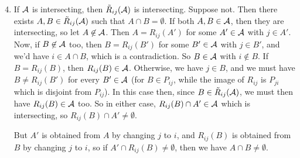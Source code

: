 \begin{enumerate}\setcounter{enumi}{3}
	\item  If $\mathcal{A}$ is intersecting, then $\tilde{R}_{ij}(\mathcal{A})$ is intersecting.
	Suppose not. Then there exists $A,B\in \tilde{R}_{ij}(\mathcal{A})$ such that $A\cap B= \emptyset$. If both $A,B\in \mathcal{A}$, then they are intersecting, so let $A\not \in \mathcal{A}$. Then $A = R_{ij}(A')$ for some $ A'\in \mathcal{A}$ with $j\in A'$. Now, if $B \not \in \mathcal{A}$ too, then $B = R_{ij}(B')$ for some $B'\in \mathcal{A}$ with $j\in B'$, and we'd have $i\in A\cap B$, which is a contradiction. So $B\in \mathcal{A}$ with $i\not\in B$.  If $B= R_{ij}(B)$, then $R_{ij}(B)\in \mathcal{A}$. Otherwise, we have $j \in B$, and we must  have $B \neq R_{ij}(B')$ for every $B'\in \mathcal{A}$ (for   $B\in P_{ij}$, while the image of $R_{ij}$ is  $P_{ji}$ which is disjoint from $P_{ij}$). In this case then, since $B\in \tilde{R}_{ij}(\mathcal{A})$, we must then have $R_{ij}(B)\in \mathcal{A}$ too. So in either case, $R_{ij}(B)\cap A'\in \mathcal{A}$ which is intersecting, so $R_{ij}(B)\cap A' \neq \emptyset$.










	But $A'$ is obtained from $A$ by changing $j$ to $i$, and $R_{ij}(B)$ is obtained from $B$ by changing $j$ to $i$, so if $A'\cap R_{ij}(B) \neq \emptyset$, then we have $A\cap B\neq \emptyset$.



\end{enumerate}

